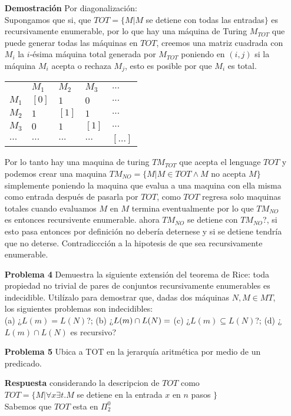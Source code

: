 \documentclass{article}
\begin{document}
\begin{enumerate}
\item[\bf{Demostración}] Por diagonalización:\\

Supongamos que si, que $TOT = \{ M | M $ se detiene con todas las entradas$ \}$ es recursivamente enumerable, por lo que hay una máquina de Turing $M_{TOT}$ que puede generar todas las máquinas en $TOT$, creemos una matriz cuadrada con $M_i$ la $i$-ésima máquina total generada por $M_{TOT}$ poniendo en $(i,j)$ si la máquina $M_i$ acepta o rechaza $M_j$, esto es posible por que $M_i$ es total.

\begin{tabular}{|l||l|l|l|l|}
  \hline
          & $M_1$ & $M_2$ & $M_3$ & $...$ \\
   $M_1$  & $[0]$   & $1$   & $0$   & $...$ \\
   $M_2$  & $1$   & $[1]$   & $1$   & $...$ \\
   $M_3$  & $0$   & $1$   & $[1]$   & $...$ \\
   $...$  & $...$ & $...$ & $...$ & $[...]$ \\ 
  \hline  
\end{tabular}

Por lo tanto hay una maquina de turing $TM_{TOT}$ que acepta el lenguage $TOT$ y podemos crear una maquina $TM_{NO} = \{M | M \in TOT \wedge M$ no acepta $M \}$ simplemente poniendo la maquina que evalua a una maquina con ella misma como entrada después de pasarla por $TOT$, como $TOT$ regresa solo maquinas totales cuando evaluamos $M$ en $M$ termina eventualmente por lo que $TM_{NO}$ es entonces recursivente enumerable.
ahora $TM_{NO}$ se detiene con $TM_{NO}$?, si esto pasa entonces por definición no debería deternese y si se detiene tendría que no deterse. Contradiccción a la hipotesis de que sea recursivamente enumerable.\\



\item[\bf{Problema 4}]Demuestra la siguiente extensión del teorema de Rice: toda propiedad no trivial de pares de conjuntos recursivamente enumerables es indecidible. Utilízalo para demostrar que, dadas dos máquinas $N, M \in MT$, los siguientes problemas son indecidibles:
\\

(a) ¿$L(m) = L(N)$?; (b) ¿$L(m) \cap L(N)=\empty$  (c) ¿$L(m) \subseteq L(N)$?; (d) ¿$L(m)\cap L(N)$ es recursivo?


\item[\bf{Problema 5}]Ubica a TOT en la jerarquía aritmética por medio de un predicado. 
\item[\bf{Respuesta}]
considerando la descripcion de $TOT$ como \\
$TOT=\{M| \forall x \exists t. M $ se detiene en la entrada $ x $ en $ n $ pasos $\}$\\
Sabemos que $TOT$ esta en $\Pi_2^0$


\end{enumerate}
\end{document}
